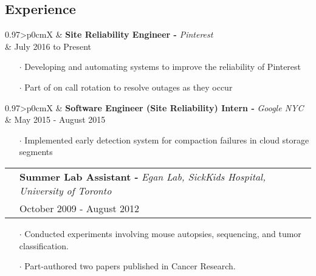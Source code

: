 \documentclass[letterpaper, oneside, final]{scrartcl} %
\newcommand{\gray}{\rowcolor[gray]{.90}} %
\begin{document}
\begin{center}

\vspace{-0.5cm}

\section{Experience}

\renewcommand{\arraystretch}{1.3}

\begin{tabularx}{0.97\linewidth}{>{\raggedleft\scshape}p{0cm}X}
\gray & \textbf{Site Reliability Engineer -} \textit{Pinterest}\\
\gray & {July 2016 to Present}\\
\end{tabularx}
\vspace{-0.1cm}
\begin{itemize} \itemsep-0.2cm
\item[$\cdot$] Developing and automating systems to improve the reliability of Pinterest\\
\item[$\cdot$] Part of on call rotation to resolve outages as they occur\\
\end{itemize}

\begin{tabularx}{0.97\linewidth}{>{\raggedleft\scshape}p{0cm}X}
\gray & \textbf{Software Engineer (Site Reliability) Intern -} \textit{Google NYC}\\
\gray & {May 2015 - August 2015}\\
\end{tabularx}
\vspace{-0.1cm}
\begin{itemize} \itemsep-0.2cm
\item[$\cdot$] Implemented early detection system for compaction failures in cloud storage segments\\
\end{itemize}

\begin{tabularx}{0.97\linewidth}{>{\raggedleft\scshape}p{0cm}X}
\gray & \textbf{Summer Lab Assistant -} \textit{Egan Lab, SickKids Hospital, University of Toronto}\\
\gray & {October 2009 - August 2012}\\
\end{tabularx}
\vspace{-0.1cm}
\begin{itemize} \itemsep-0.2cm
\item[$\cdot$] Conducted experiments involving mouse autopsies, sequencing, and tumor classification.
\item[$\cdot$] Part-authored two papers published in Cancer Research.\\
\end{itemize}


\end{center}
\end{document}
